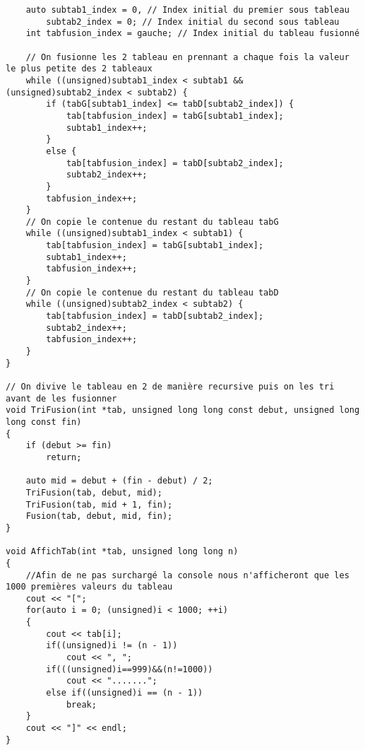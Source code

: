 \begin{verbatim}
    auto subtab1_index = 0, // Index initial du premier sous tableau
        subtab2_index = 0; // Index initial du second sous tableau
    int tabfusion_index = gauche; // Index initial du tableau fusionné

    // On fusionne les 2 tableau en prennant a chaque fois la valeur le plus petite des 2 tableaux
    while ((unsigned)subtab1_index < subtab1 && (unsigned)subtab2_index < subtab2) {
        if (tabG[subtab1_index] <= tabD[subtab2_index]) {
            tab[tabfusion_index] = tabG[subtab1_index];
            subtab1_index++;
        }
        else {
            tab[tabfusion_index] = tabD[subtab2_index];
            subtab2_index++;
        }
        tabfusion_index++;
    }
    // On copie le contenue du restant du tableau tabG
    while ((unsigned)subtab1_index < subtab1) {
        tab[tabfusion_index] = tabG[subtab1_index];
        subtab1_index++;
        tabfusion_index++;
    }
    // On copie le contenue du restant du tableau tabD
    while ((unsigned)subtab2_index < subtab2) {
        tab[tabfusion_index] = tabD[subtab2_index];
        subtab2_index++;
        tabfusion_index++;
    }
}

// On divive le tableau en 2 de manière recursive puis on les tri avant de les fusionner
void TriFusion(int *tab, unsigned long long const debut, unsigned long long const fin)
{
    if (debut >= fin)
        return;

    auto mid = debut + (fin - debut) / 2;
    TriFusion(tab, debut, mid);
    TriFusion(tab, mid + 1, fin);
    Fusion(tab, debut, mid, fin);
}

void AffichTab(int *tab, unsigned long long n)
{
    //Afin de ne pas surchargé la console nous n'afficheront que les 1000 premières valeurs du tableau
    cout << "[";
    for(auto i = 0; (unsigned)i < 1000; ++i)
    {
        cout << tab[i];
        if((unsigned)i != (n - 1))
            cout << ", ";
        if(((unsigned)i==999)&&(n!=1000))
            cout << ".......";
        else if((unsigned)i == (n - 1))
            break;
    }
    cout << "]" << endl;
}
\end{verbatim}

